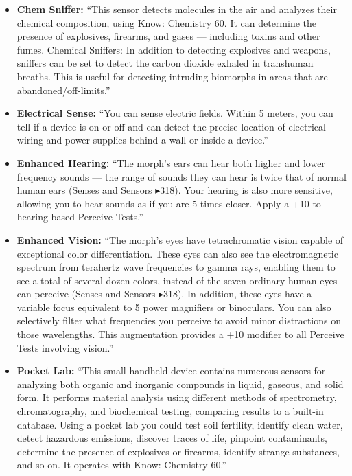 \begin{itemize}
    \item \textbf{Chem Sniffer:} “This sensor detects molecules in the air and analyzes their chemical composition, using Know: Chemistry 60. It can determine the presence of explosives, firearms, and gases — including toxins and other fumes. Chemical Sniffers: In addition to detecting explosives and weapons, sniffers can be set to detect the carbon dioxide exhaled in transhuman breaths. This is useful for detecting intruding biomorphs in areas that are abandoned/off-limits.” \citep[pg. 318, 373]{ep2e_1.1_2019}

    \item \textbf{Electrical Sense:} “You can sense electric fields. Within 5 meters, you can tell if a device is on or off and can detect the precise location of electrical wiring and power supplies behind a wall or inside a device.” \citep[pg. 318]{ep2e_1.1_2019}

    \item \textbf{Enhanced Hearing:} “The morph’s ears can hear both higher and lower frequency sounds — the range of sounds they can hear is twice that of normal human ears (Senses and Sensors $\blacktriangleright$318). Your hearing is also more sensitive, allowing you to hear sounds as if you are 5 times closer. Apply a +10 to hearing-based Perceive Tests.” \citep[pg. 318]{ep2e_1.1_2019}

    \item \textbf{Enhanced Vision:} “The morph’s eyes have tetrachromatic vision capable of exceptional color differentiation. These eyes can also see the electromagnetic spectrum from terahertz wave frequencies to gamma rays, enabling them to see a total of several dozen colors, instead of the seven ordinary human eyes can perceive (Senses and Sensors $\blacktriangleright$318). In addition, these eyes have a variable focus equivalent to 5 power magnifiers or binoculars. You can also selectively filter what frequencies you perceive to avoid minor distractions on those wavelengths. This augmentation provides a +10 modifier to all Perceive Tests involving vision.”  \citep[pg. 318]{ep2e_1.1_2019}

    \item \textbf{Pocket Lab:} “This small handheld device contains numerous sensors for analyzing both organic and inorganic compounds in liquid, gaseous, and solid form. It performs material analysis using different methods of spectrometry, chromatography, and biochemical testing, comparing results to a built-in database. Using a pocket lab you could test soil fertility, identify clean water, detect hazardous emissions, discover traces of life, pinpoint contaminants, determine the presence of explosives or firearms, identify strange substances, and so on. It operates with Know: Chemistry 60.” \citep[pg. 340]{ep2e_1.1_2019}


\end{itemize}
